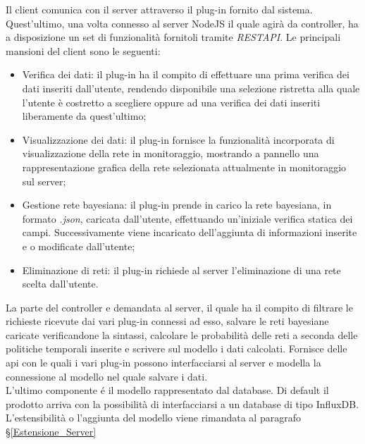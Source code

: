 Il client comunica con il server attraverso il plug-in fornito dal sistema. Quest'ultimo, una volta connesso al server NodeJS il quale agirà da controller, ha a disposizione un set di funzionalità fornitoli tramite \textit{REST}\glossario \textit{API}\glossario . Le principali mansioni del client sono le seguenti: 
\begin{itemize}
	\item Verifica dei dati: il plug-in ha il compito di effettuare una prima verifica dei dati inseriti dall'utente, rendendo disponibile una selezione ristretta alla quale l'utente è costretto a scegliere oppure ad una verifica dei dati inseriti liberamente da quest'ultimo;
	\item Visualizzazione dei dati: il plug-in fornisce la funzionalità incorporata di visualizzazione della rete in monitoraggio, mostrando a pannello una rappresentazione grafica della rete selezionata attualmente in monitoraggio sul server;
	\item Gestione rete bayesiana: il plug-in prende in carico la rete bayesiana, in formato \textit{.json}, caricata dall'utente, effettuando un'iniziale verifica statica dei campi. Successivamente viene incaricato dell'aggiunta di informazioni inserite e o modificate dall'utente; 
	\item Eliminazione di reti: il plug-in richiede al server l'eliminazione di una rete scelta dall'utente. 
\end{itemize}
La parte del controller e demandata al server, il quale ha il compito di filtrare le richieste ricevute dai vari plug-in connessi ad esso, salvare le reti bayesiane caricate verificandone la sintassi, calcolare le probabilità delle reti a seconda delle politiche temporali inserite e scrivere sul modello i dati calcolati. 
Fornisce delle api con le quali i vari plug-in possono interfacciarsi al server e modella la connessione al modello nel quale salvare i dati. \\ 
L'ultimo componente é il modello rappresentato dal database. Di default il prodotto arriva con la possibilità di interfacciarsi a un database
di tipo InfluxDB. L'estensibilità o l'aggiunta del modello viene rimandata al paragrafo §\ref{Estensione_Server}


